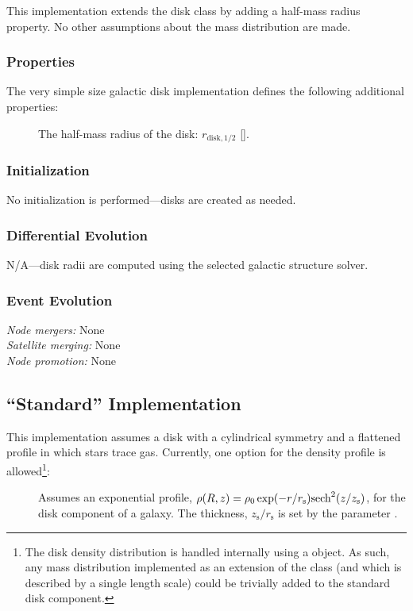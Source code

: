 This implementation extends the  disk class by adding a half-mass radius property. No other assumptions about the mass distribution are made.

\subsubsection{Properties}

The very simple size galactic disk implementation defines the following additional properties:
\begin{description}
 \item [] The half-mass radius of the disk: $r_\mathrm{disk, 1/2}$ [].
\end{description}

\subsubsection{Initialization}

No initialization is performed---disks are created as needed.

\subsubsection{Differential Evolution}

N/A---disk radii are computed using the selected galactic structure solver.

\subsubsection{Event Evolution}

\noindent\emph{Node mergers:} None\\

\noindent\emph{Satellite merging:} None\\

\noindent\emph{Node promotion:} None\\

\subsection{``Standard'' Implementation}\label{sec:DiskStandard}

This implementation assumes a disk with a cylindrical symmetry and a flattened profile in which stars trace gas. Currently, one option for the density profile is allowed\footnote{The disk density distribution is handled internally using a \protect{} object. As such, any mass distribution implemented as an extension of the  class (and which is described by a single length scale) could be trivially added to the standard disk component.}:
\begin{description}
\item [] Assumes an exponential profile, $\rho(R,z) = \rho_0 \exp(-r/r_\mathrm{s}) \hbox{sech}^2(z/z_\mathrm{s})$, for the disk \gls{component} of a galaxy. The thickness, $z_\mathrm{s}/r_\mathrm{s}$ is set by the parameter \mono{[heightToRadialScaleDisk]}.
\end{description}

